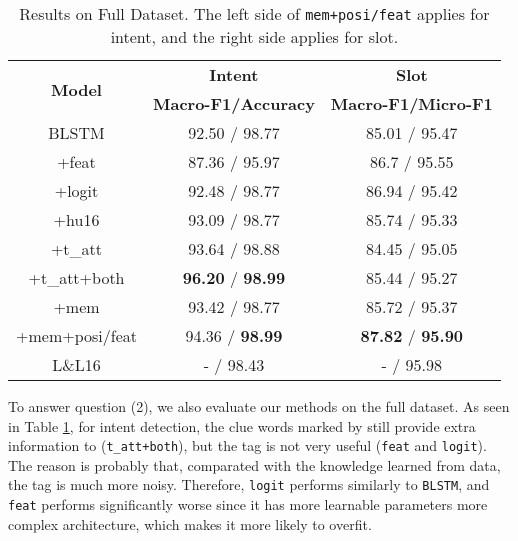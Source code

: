 \begin{table}
\setlength{\tabcolsep}{0.23em}
\centering
\small{
\begin{tabular}{|c|c|c|}

\hline
\multirow{2}{*}{\textbf{Model}} & \textbf{Intent} & \textbf{Slot} \\ 
\cline{2-3}
  & \textbf{Macro-F1/Accuracy} &  \textbf{Macro-F1/Micro-F1} \\
\hline
BLSTM & 92.50 / 98.77  & 85.01 / 95.47\\
\hline
+feat & 87.36 / 95.97 & 86.7 / 95.55\\
\hline
+logit & 92.48 / 98.77 & 86.94 / 95.42  \\
\hline
+hu16 & 93.09 / 98.77 & 85.74 / 95.33  \\
\hline
+t\_att & 93.64 / 98.88  & 84.45 / 95.05\\
\hline
+t\_att+both & \textbf{96.20} / \textbf{98.99} & 85.44 / 95.27 \\
\hline
+mem & 93.42 / 98.77 & 85.72 / 95.37\\
\hline
+mem+posi/feat & 94.36 / \textbf{98.99} & \textbf{87.82} / \textbf{95.90} \\
\hline
\hline
L\&L16 & - / 98.43 & - / 95.98\\
\hline 

\end{tabular}
}
\caption{Results on Full Dataset. The left side of \texttt{mem+posi/feat} applies for intent, and the right side applies for slot.} 
\label{tab_full}
\end{table}

To answer question (2), we also evaluate our methods on the full dataset. 
As seen in Table \ref{tab_full}, for intent detection,
the clue words marked by \RE still provide extra information to \NN (\texttt{t\_att+both}),
but the \RE tag is not very useful (\texttt{feat} and \texttt{logit}).
The reason is probably that, comparated with the knowledge learned from data, the \RE tag is much more noisy. 
Therefore, \texttt{logit} performs similarly to \texttt{BLSTM}, and \texttt{feat} performs significantly worse since it has more learnable parameters more complex architecture, which makes it more likely to overfit.


